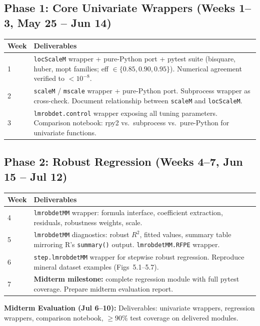 \documentclass[11pt, a4paper]{article}
\begin{document}
\subsection{Phase 1: Core Univariate Wrappers (Weeks 1--3, May 25 -- Jun 14)}

\begin{tabularx}{\linewidth}{@{} l X @{}}
  \toprule
  \textbf{Week} & \textbf{Deliverables} \\
  \midrule
  1 & \texttt{locScaleM} wrapper + pure-Python port + pytest suite
    (bisquare, huber, mopt families; eff $\in \{0.85, 0.90, 0.95\}$).
    Numerical agreement verified to $< 10^{-8}$. \\
  2 & \texttt{scaleM} / \texttt{mscale} wrapper + pure-Python port.
    Subprocess wrapper as cross-check.
    Document relationship between \texttt{scaleM} and \texttt{locScaleM}. \\
  3 & \texttt{lmrobdet.control} wrapper exposing all tuning parameters.
    Comparison notebook: rpy2 vs.\ subprocess vs.\ pure-Python for
    univariate functions. \\
  \bottomrule
\end{tabularx}

\subsection{Phase 2: Robust Regression (Weeks 4--7, Jun 15 -- Jul 12)}

\begin{tabularx}{\linewidth}{@{} l X @{}}
  \toprule
  \textbf{Week} & \textbf{Deliverables} \\
  \midrule
  4 & \texttt{lmrobdetMM} wrapper: formula interface, coefficient
    extraction, residuals, robustness weights, scale. \\
  5 & \texttt{lmrobdetMM} diagnostics: robust $R^2$, fitted values,
    summary table mirroring R's \texttt{summary()} output.
    \texttt{lmrobdetMM.RFPE} wrapper. \\
  6 & \texttt{step.lmrobdetMM} wrapper for stepwise robust regression.
    Reproduce mineral dataset examples (Figs~5.1--5.7). \\
  7 & \textbf{Midterm milestone:} complete regression module with
    full pytest coverage.
    Prepare midterm evaluation report. \\
  \bottomrule
\end{tabularx}

\vspace{0.3em}
\noindent\textbf{Midterm Evaluation (Jul 6--10):}
Deliverables: univariate wrappers, regression wrappers, comparison
notebook, $\geq 90\%$ test coverage on delivered modules.
\end{document}
